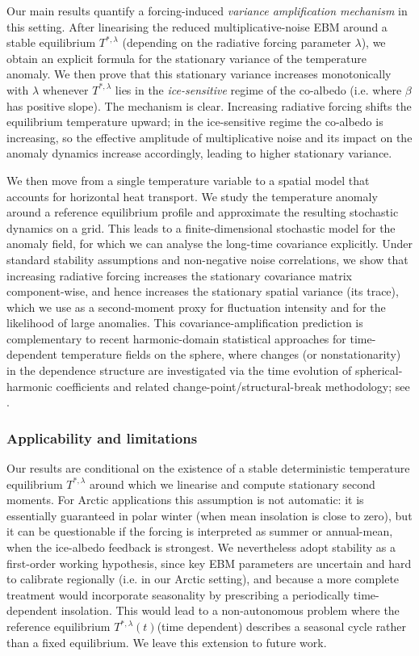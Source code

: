 \documentclass[10pt]{amsart}
\numberwithin{equation}{section}
\begin{document}
Our main results quantify a forcing-induced \emph{variance amplification mechanism} in this setting. After
linearising the reduced multiplicative-noise EBM around a stable equilibrium $T^{*,\lambda}$ (depending on
the radiative forcing parameter $\lambda$), we obtain an explicit formula for the stationary variance of the
temperature anomaly. We then prove that this stationary variance increases monotonically with $\lambda$
whenever $T^{*,\lambda}$ lies in the \emph{ice-sensitive} regime of the co-albedo (i.e. where $\beta$ has
positive slope). The mechanism is clear. Increasing radiative forcing shifts the equilibrium
temperature upward; in the ice-sensitive regime the co-albedo is increasing, so the effective amplitude of
multiplicative noise and its impact on the anomaly dynamics increase accordingly, leading to higher
stationary variance.


We then move from a single temperature variable to a spatial model that accounts for horizontal heat transport. We study the temperature anomaly around a reference equilibrium profile and approximate the resulting stochastic dynamics on a grid. This leads to a finite-dimensional stochastic model for the anomaly field, for which we can analyse the long-time covariance explicitly. Under standard stability assumptions and non-negative noise correlations, we show that increasing radiative forcing increases the stationary covariance matrix component-wise, and hence increases the stationary spatial variance (its trace), which we use as a second-moment proxy for fluctuation intensity and for the likelihood of large anomalies. This covariance-amplification prediction is complementary to recent harmonic-domain statistical approaches for time-dependent temperature fields on the sphere, where changes (or nonstationarity) in the dependence structure are investigated via the time evolution of spherical-harmonic coefficients and related change-point/structural-break methodology; see \cite{Caponera2021,Caponera2023,Marinucci2021,Marinucci2024}.
\subsubsection*{Applicability and limitations} Our results are conditional on the existence of a stable deterministic temperature equilibrium
$T^{*,\lambda}$ around which we linearise and compute stationary second moments. For Arctic applications this
assumption is not automatic: it is essentially guaranteed in polar winter (when mean insolation is close to
zero), but it can be questionable if the forcing is interpreted as summer or annual-mean, when the
ice-albedo feedback is strongest. We nevertheless adopt stability as a first-order working hypothesis,
since key EBM parameters are uncertain and hard to calibrate regionally (i.e. in our Arctic setting), and because a more complete treatment would incorporate seasonality by prescribing a periodically time-dependent insolation. This would lead to a non-autonomous problem where the reference equilibrium $T^{*,\lambda}(t)$(time dependent) describes a seasonal cycle rather than a fixed equilibrium. We leave this extension to
future work.
\end{document}

